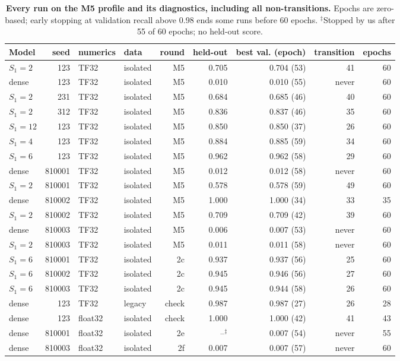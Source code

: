 \begin{table}[h]
\centering
\scriptsize
\begin{tabular}{lrllrrrrr}
\toprule
Model & seed & numerics & data & round & held-out & best val. (epoch) & transition & epochs \\
\midrule
$S_1{=}2$ & 123 & TF32 & isolated & M5 & 0.705 & 0.704 (53) & 41 & 60 \\
dense & 123 & TF32 & isolated & M5 & 0.010 & 0.010 (55) & never & 60 \\
$S_1{=}2$ & 231 & TF32 & isolated & M5 & 0.684 & 0.685 (46) & 40 & 60 \\
$S_1{=}2$ & 312 & TF32 & isolated & M5 & 0.836 & 0.837 (46) & 35 & 60 \\
$S_1{=}12$ & 123 & TF32 & isolated & M5 & 0.850 & 0.850 (37) & 26 & 60 \\
$S_1{=}4$ & 123 & TF32 & isolated & M5 & 0.884 & 0.885 (59) & 34 & 60 \\
$S_1{=}6$ & 123 & TF32 & isolated & M5 & 0.962 & 0.962 (58) & 29 & 60 \\
dense & 810001 & TF32 & isolated & M5 & 0.012 & 0.012 (58) & never & 60 \\
$S_1{=}2$ & 810001 & TF32 & isolated & M5 & 0.578 & 0.578 (59) & 49 & 60 \\
dense & 810002 & TF32 & isolated & M5 & 1.000 & 1.000 (34) & 33 & 35 \\
$S_1{=}2$ & 810002 & TF32 & isolated & M5 & 0.709 & 0.709 (42) & 39 & 60 \\
dense & 810003 & TF32 & isolated & M5 & 0.006 & 0.007 (53) & never & 60 \\
$S_1{=}2$ & 810003 & TF32 & isolated & M5 & 0.011 & 0.011 (58) & never & 60 \\
$S_1{=}6$ & 810001 & TF32 & isolated & 2c & 0.937 & 0.937 (56) & 25 & 60 \\
$S_1{=}6$ & 810002 & TF32 & isolated & 2c & 0.945 & 0.946 (56) & 27 & 60 \\
$S_1{=}6$ & 810003 & TF32 & isolated & 2c & 0.945 & 0.944 (58) & 26 & 60 \\
dense & 123 & TF32 & legacy & check & 0.987 & 0.987 (27) & 26 & 28 \\
dense & 123 & float32 & isolated & check & 1.000 & 1.000 (42) & 41 & 43 \\
dense & 810001 & float32 & isolated & 2e & --$^\ddagger$ & 0.007 (54) & never & 55 \\
dense & 810003 & float32 & isolated & 2f & 0.007 & 0.007 (57) & never & 60 \\
\bottomrule
\end{tabular}
\caption{\textbf{Every run on the M5 profile and its diagnostics, including all non-transitions.} Epochs are zero-based; early stopping at validation recall above 0.98 ends some runs before 60 epochs. $^\ddagger$Stopped by us after 55 of 60 epochs; no held-out score.}
\label{tab:allruns}
\end{table}
